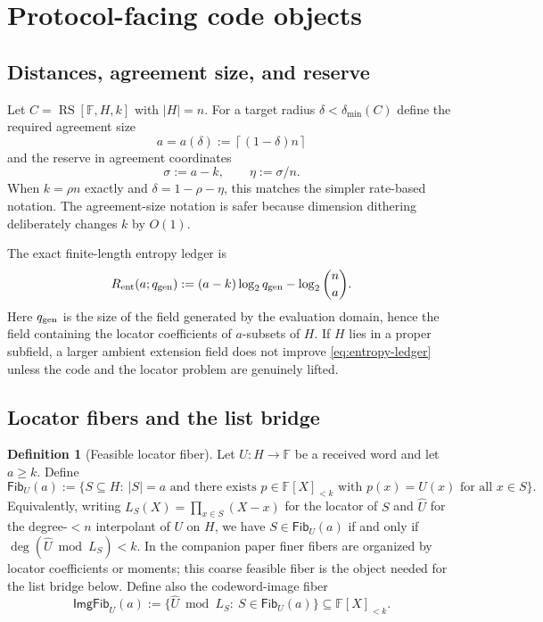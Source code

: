 \documentclass[11pt]{article}
\theoremstyle{definition}
\newtheorem{definition}[theorem]{Definition}
\newcommand{\F}{\mathbb F}
\newcommand{\RS}{\operatorname{RS}}
\newcommand{\qgen}{q_{\rm gen}}
\newcommand{\Fib}{\mathsf{Fib}}
\newcommand{\ImgFib}{\mathsf{ImgFib}}
\newcommand{\entres}{R_{\rm ent}}
\newcommand{\ceil}[1]{\left\lceil #1\right\rceil}
\begin{document}
\section{Protocol-facing code objects}
\label{sec:objects}

\subsection{Distances, agreement size, and reserve}

Let $C=\RS[\F,H,k]$ with $|H|=n$.  For a target radius $\delta<\delta_{\min}(C)$ define the required agreement size
\[
        a=a(\delta):=\ceil{(1-\delta)n}
\]
and the reserve in agreement coordinates
\[
        \sigma:=a-k,
        \qquad
        \eta:=\sigma/n .
\]
When $k=\rho n$ exactly and $\delta=1-\rho-\eta$, this matches the simpler rate-based notation.  The agreement-size notation is safer because dimension dithering deliberately changes $k$ by $O(1)$.

The exact finite-length entropy ledger is
\begin{equation}
\label{eq:entropy-ledger}
        \entres(a;\qgen)
        :=(a-k)\log_2\qgen-\log_2\binom n a .
\end{equation}
Here $\qgen$ is the size of the field generated by the evaluation domain, hence the field containing the locator coefficients of $a$-subsets of $H$.  If $H$ lies in a proper subfield, a larger ambient extension field does not improve \eqref{eq:entropy-ledger} unless the code and the locator problem are genuinely lifted.

\subsection{Locator fibers and the list bridge}
\label{sec:fibers}

\begin{definition}[Feasible locator fiber]
\label{def:fiber}
Let $U:H\to\F$ be a received word and let $a\ge k$.  Define
\[
        \Fib_U(a):=\bigl\{S\subseteq H:\
        |S|=a \text{ and there exists } p\in\F[X]_{<k}
        \text{ with } p(x)=U(x) \text{ for all } x\in S\bigr\}.
\]
Equivalently, writing $L_S(X)=\prod_{x\in S}(X-x)$ for the locator of $S$ and $\widehat U$ for the degree-$<n$ interpolant of $U$ on $H$, we have $S\in\Fib_U(a)$ if and only if $\deg(\widehat U\bmod L_S)<k$.  In the companion paper finer fibers are organized by locator coefficients or moments; this coarse feasible fiber is the object needed for the list bridge below.
Define also the codeword-image fiber
\[
        \ImgFib_U(a):=\{\widehat U\bmod L_S:\ S\in\Fib_U(a)\}
        \subseteq \F[X]_{<k}.
\]
\end{definition}
\end{document}
